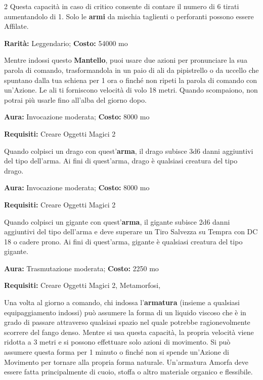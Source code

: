 \begin{multicols}{2}
Questa capacità in caso di critico consente di contare il numero di 6 tirati aumentandolo di 1. Solo le \textbf{armi} da mischia taglienti o perforanti possono essere Affilate.


\textbf{Rarità:} Leggendario; \textbf{Costo:} 54000 mo

Mentre indossi questo \textbf{Mantello}, puoi usare due azioni per pronunciare la sua parola di comando, trasformandola in un paio di ali da pipistrello o da uccello che spuntano dalla tua schiena per 1 ora o finché non ripeti la parola di comando con un'Azione. Le ali ti forniscono velocità di volo 18 metri. Quando scompaiono, non potrai più usarle fino all'alba del giorno dopo.


\textbf{Aura:} Invocazione moderata; \textbf{Costo:} 8000 mo

\textbf{Requisiti:} Creare Oggetti Magici 2

Quando colpisci un drago con quest'\textbf{arma}, il drago subisce 3d6 danni aggiuntivi del tipo dell'arma. Ai fini di quest'arma, drago è qualsiasi creatura del tipo drago.


\textbf{Aura:} Invocazione moderata; \textbf{Costo:} 8000 mo

\textbf{Requisiti:} Creare Oggetti Magici 2

Quando colpisci un gigante con quest'\textbf{arma}, il gigante subisce 2d6 danni aggiuntivi del tipo dell'arma e deve superare un Tiro Salvezza su Tempra con DC 18 o cadere prono. Ai fini di quest'arma, gigante è qualsiasi creatura del tipo gigante.


\textbf{Aura:} Trasmutazione moderata; \textbf{Costo:} 2250 mo

\textbf{Requisiti:} Creare Oggetti Magici 2, Metamorfosi,

Una volta al giorno a comando, chi indossa l'\textbf{armatura} (insieme a qualsiasi equipaggiamento indossi) può assumere la forma di un liquido viscoso che è in grado di passare attraverso qualsiasi spazio nel quale potrebbe ragionevolmente scorrere del fango denso. Mentre si usa questa capacità, la propria velocità viene ridotta a 3 metri e si possono effettuare solo azioni di movimento. Si può assumere questa forma per 1 minuto o finché non si spende un'Azione di Movimento per tornare alla propria forma naturale. Un'armatura Amorfa deve essere fatta principalmente di cuoio, stoffa o altro materiale organico e flessibile.


\end{multicols}
